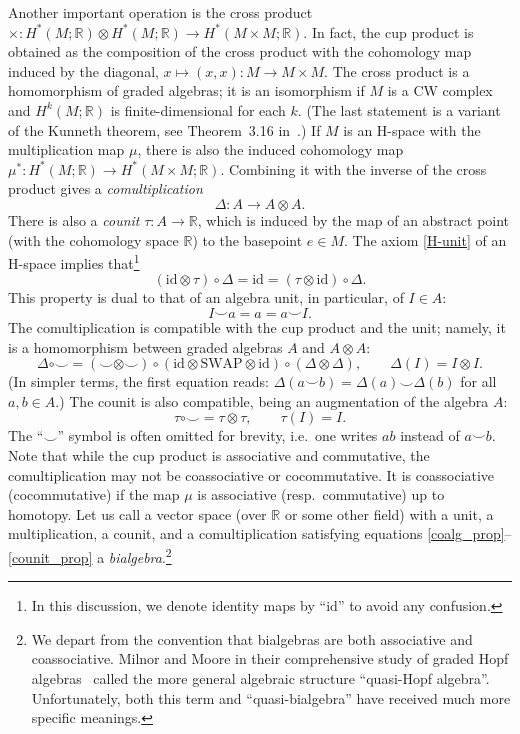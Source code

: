 \documentclass[12pt]{article}
\newcommand{\RR}{\mathbb{R}}
\newcommand{\id}{\mathrm{id}}
\newcommand{\Sw}{\mathrm{SWAP}}
\newtheorem[definition]{Definition}[Theorem]{Definition}
\newtheorem[remark]{Example}[Theorem]{Example}
\newtheorem[remark]{Remark}[Theorem]{Remark}
\newtheorem[remark]{Question}[Theorem]{Open question}
\newtheorem*[definition]{definition}{Definition}
\newtheorem*[remark]{example}{Example}
\newtheorem*[remark]{remark}{Remark}
\newtheorem*[remark]{question}{Open question}
\numberwithin{equation}{section}
\begin{document}
Another important operation is the cross product ${\times}\colon H^*(M;\RR)\otimes H^*(M;\RR)\to H^*(M\times M;\RR)$. In fact, the cup product is obtained as the composition of the cross product with the cohomology map induced by the diagonal, $x\mapsto(x,x)\colon M\to M\times M$. The cross product is a homomorphism of graded algebras; it is an isomorphism if $M$ is a CW complex and $H^k(M;\RR)$ is finite-dimensional for each $k$. (The last statement is a variant of the Kunneth theorem, see Theorem~3.16 in~\cite{Hat-at}.) If $M$ is an H-space with the multiplication map $\mu$, there is also the induced cohomology map $\mu^*\colon H^*(M;\RR)\to H^*(M\times M;\RR)$. Combining it with the inverse of the cross product gives a \emph{comultiplication}
\begin{equation}
\Delta\colon A\to A\otimes A.
\end{equation}
There is also a \emph{counit} $\tau\colon A\to\RR$, which is induced by the map of an abstract point (with the cohomology space $\RR$) to the basepoint $e\in M$. The axiom \eqref{H-unit} of an H-space implies that\footnote{In this discussion, we denote identity maps by ``$\id$'' to avoid any confusion.}
\begin{equation}\label{coalg_prop}
(\id\otimes\tau)\circ\Delta = \id = (\tau\otimes\id)\circ\Delta.
\end{equation}
This property is dual to that of an algebra unit, in particular, of $I\in A$:
\begin{equation}\label{alg_prop}
I\smile a = a = a\smile I.
\end{equation}
The comultiplication is compatible with the cup product and the unit; namely, it is a homomorphism between graded algebras $A$ and $A\otimes A$:
\begin{equation}\label{comult_prop}
\Delta\circ{\smile} =({\smile}\otimes{\smile}) \circ (\id\otimes\Sw\otimes\id)
\circ (\Delta\otimes\Delta),\qquad \Delta(I)=I\otimes I.
\end{equation}
(In simpler terms, the first equation reads: $\Delta(a\smile b)=\Delta(a)\smile\Delta(b)$ for all $a,b\in A$.) The counit is also compatible, being an augmentation of the algebra $A$:
\begin{equation}\label{counit_prop}
\tau\circ{\smile}=\tau\otimes\tau,\qquad \tau(I)=I.
\end{equation}
The ``$\smile$'' symbol is often omitted for brevity, i.e.\ one writes $ab$ instead of $a\smile b$. Note that while the cup product is associative and commutative, the comultiplication may not be coassociative or cocommutative. It is coassociative (cocommutative) if the map $\mu$ is associative (resp.\ commutative) up to homotopy. Let us call a vector space (over $\RR$ or some other field) with a unit, a multiplication, a counit, and a comultiplication satisfying equations \eqref{coalg_prop}--\eqref{counit_prop} a \emph{bialgebra}.\footnote{We depart from the convention that bialgebras are both associative and coassociative. Milnor and Moore in their comprehensive study of graded Hopf algebras~\cite{MiMo65} called the more general algebraic structure ``quasi-Hopf algebra''. Unfortunately, both this term and ``quasi-bialgebra'' have received much more specific meanings.}
\end{document}
